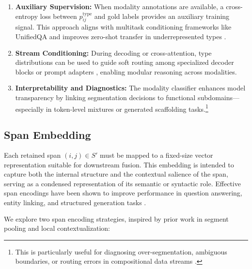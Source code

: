 \begin{enumerate}
  \item \textbf{Auxiliary Supervision:} When modality annotations are available, a cross-entropy loss between \(p^\mathrm{type}_{ij}\) and gold labels provides an auxiliary training signal. This approach aligns with multitask conditioning frameworks like UnifiedQA \cite{khashabi2020unifiedqa} and improves zero-shot transfer in underrepresented types \cite{gupta2022molt}.

  \item \textbf{Stream Conditioning:} During decoding or cross-attention, type distributions can be used to guide soft routing among specialized decoder blocks or prompt adapters \cite{li2021prefix}, enabling modular reasoning across modalities.

  \item \textbf{Interpretability and Diagnostics:} The modality classifier enhances model transparency by linking segmentation decisions to functional subdomains—especially in token-level mixtures or generated scaffolding tasks.\footnote{This is particularly useful for diagnosing over-segmentation, ambiguous boundaries, or routing errors in compositional data streams \cite{lin2022glaive, tay2021charformer}.}
\end{enumerate}

\subsection{Span Embedding}

Each retained span \((i,j)\in S'\) must be mapped to a fixed-size vector representation suitable for downstream fusion. This embedding is intended to capture both the internal structure and the contextual salience of the span, serving as a condensed representation of its semantic or syntactic role. Effective span encodings have been shown to improve performance in question answering, entity linking, and structured generation tasks \cite{lee2017end, joshi2020spanbert, cheng2020probing}.

We explore two span encoding strategies, inspired by prior work in segment pooling and local contextualization:

